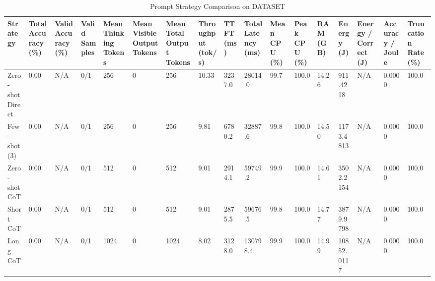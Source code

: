 \begin{table}
\caption{Prompt Strategy Comparison on DATASET}
\label{tab:strategy_comparison}
\begin{tabular}{lllllllllllllllll}
\toprule
Strategy & Total Accuracy (\%) & Valid Accuracy (\%) & Valid Samples & Mean Thinking Tokens & Mean Visible Output Tokens & Mean Total Output Tokens & Throughput (tok/s) & TTFT (ms) & Total Latency (ms) & Mean CPU (\%) & Peak CPU (\%) & RAM (GB) & Energy (J) & Energy / Correct (J) & Accuracy / Joule & Truncation Rate (\%) \\
\midrule
Zero-shot Direct & 0.00 & N/A & 0/1 & 256 & 0 & 256 & 10.33 & 3237.0 & 28014.0 & 99.7 & 100.0 & 14.26 & 911.4218 & N/A & 0.0000 & 100.0 \\
Few-shot (3) & 0.00 & N/A & 0/1 & 256 & 0 & 256 & 9.81 & 6780.2 & 32887.6 & 99.8 & 100.0 & 14.50 & 1173.4813 & N/A & 0.0000 & 100.0 \\
Zero-shot CoT & 0.00 & N/A & 0/1 & 512 & 0 & 512 & 9.01 & 2914.1 & 59749.2 & 99.9 & 100.0 & 14.61 & 3502.2154 & N/A & 0.0000 & 100.0 \\
Short CoT & 0.00 & N/A & 0/1 & 512 & 0 & 512 & 9.01 & 2875.5 & 59676.5 & 99.8 & 100.0 & 14.77 & 3879.9798 & N/A & 0.0000 & 100.0 \\
Long CoT & 0.00 & N/A & 0/1 & 1024 & 0 & 1024 & 8.02 & 3128.0 & 130798.4 & 99.9 & 100.0 & 14.99 & 10852.0117 & N/A & 0.0000 & 100.0 \\
\bottomrule
\end{tabular}
\end{table}
